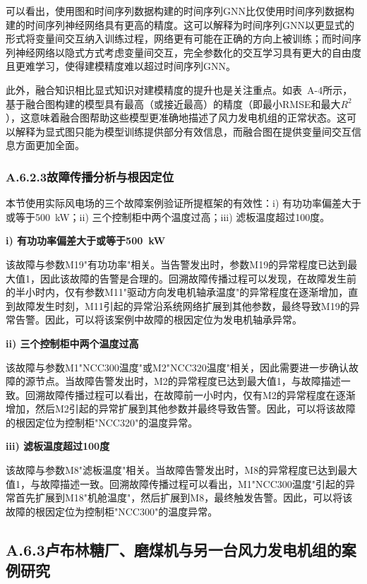 可以看出，使用图和时间序列数据构建的时间序列GNN比仅使用时间序列数据构建的时间序列神经网络具有更高的精度。这可以解释为时间序列GNN以更显式的形式将变量间交互纳入训练过程，网络更有可能在正确的方向上被训练；而时间序列神经网络以隐式方式考虑变量间交互，完全参数化的交互学习具有更大的自由度且更难学习，使得建模精度难以超过时间序列GNN。

此外，融合知识相比显式知识对建模精度的提升也是关注重点。如表~A-4所示，基于融合图构建的模型具有最高（或接近最高）的精度（即最小RMSE和最大$R^2$），这意味着融合图帮助这些模型更准确地描述了风力发电机组的正常状态。这可以解释为显式图只能为模型训练提供部分有效信息，而融合图在提供变量间交互信息方面更加全面。

\subsubsection*{A.6.2.3\quad 故障传播分析与根因定位}

本节使用实际风电场的三个故障案例验证所提框架的有效性：i) 有功功率偏差大于或等于500~kW；ii) 三个控制柜中两个温度过高；iii) 滤板温度超过100度。

\textbf{i) 有功功率偏差大于或等于500~kW}

该故障与参数M19"有功功率"相关。当告警发出时，参数M19的异常程度已达到最大值1，因此该故障的告警是合理的。回溯故障传播过程可以发现，在故障发生前的半小时内，仅有参数M11"驱动方向发电机轴承温度"的异常程度在逐渐增加，直到故障发生时刻，M11引起的异常沿系统网络扩展到其他参数，最终导致M19的异常告警。因此，可以将该案例中故障的根因定位为发电机轴承异常。

\textbf{ii) 三个控制柜中两个温度过高}

该故障与参数M1"NCC300温度"或M2"NCC320温度"相关，因此需要进一步确认故障的源节点。当故障告警发出时，M2的异常程度已达到最大值1，与故障描述一致。回溯故障传播过程可以看出，在故障前一小时内，仅有M2的异常程度在逐渐增加，然后M2引起的异常扩展到其他参数并最终导致告警。因此，可以将该故障的根因定位为控制柜"NCC320"的温度异常。

\textbf{iii) 滤板温度超过100度}

该故障与参数M8"滤板温度"相关。当故障告警发出时，M8的异常程度已达到最大值1，与故障描述一致。回溯故障传播过程可以看出，M1"NCC300温度"引起的异常首先扩展到M18"机舱温度"，然后扩展到M8，最终触发告警。因此，可以将该故障的根因定位为控制柜"NCC300"的温度异常。


\subsection*{A.6.3\quad 卢布林糖厂、磨煤机与另一台风力发电机组的案例研究}

